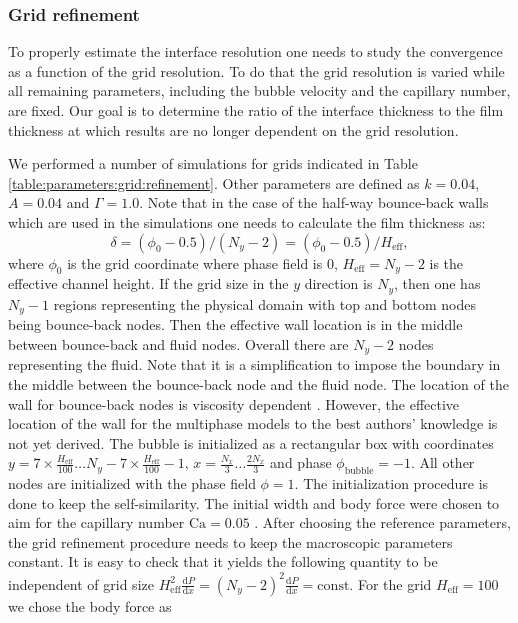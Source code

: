 \documentclass{CFD2011}
\newcommand{\Ca}{\mathrm{Ca}}
\begin{document}
\subsubsection{Grid refinement}
To properly estimate the interface resolution one needs to study the convergence as a function of
the grid resolution. To do that the grid resolution is varied while all remaining parameters,
including the bubble velocity and the capillary number, are fixed.  Our goal is to determine the 
ratio of the interface thickness to the 
film thickness at which results are no longer dependent on the grid resolution.


We performed a number of simulations for grids indicated in
Table \ref{table:parameters:grid:refinement}. Other parameters are defined as $k=0.04$, $A=0.04$ and
$\Gamma=1.0$. Note that in the case of the half-way bounce-back walls \cite{yu} which are used in
the
simulations one needs to calculate the film thickness as:
\begin{equation}
\delta=(\phi_0-0.5)/(N_y-2)=(\phi_0-0.5)/H_{\mathrm{eff}},
\end{equation}
where $\phi_0$ is the grid coordinate where phase field is $0$, $H_{\mathrm{eff}}=N_y-2$
is the effective channel height.
If the grid size in the $y$ direction is $N_y$, then one has $N_y-1$ regions representing
the physical domain with top and bottom nodes being bounce-back nodes. Then the effective wall
location is
in the middle between bounce-back and fluid
nodes. Overall there are $N_y-2$ nodes representing the fluid. Note that it is a simplification to
impose the boundary in the middle between the bounce-back
node and the fluid node. The location of the wall for bounce-back nodes is
viscosity dependent \cite{ginzburg-multireflection}.  However, the effective location of the
wall for the
multiphase models to the best authors' knowledge is not yet derived.
The bubble is initialized as a rectangular box with coordinates
$y=7\times\frac{H_\mathrm{eff}}{100}\dots N_y-7\times\frac{H_\mathrm{eff}}{100}-1$,
$x=\frac{N_x}{3}\dots \frac{2 N_x}{3}$ and phase
$\phi_{\mathrm{bubble}}=-1$. All other nodes are initialized with the phase field
$\phi=1$. The initialization procedure is done to keep the self-similarity. The initial width and
body force were chosen to aim for the capillary number $\Ca=0.05$ \cite{kuzmin-binary2d}.
After choosing the reference parameters, the grid refinement procedure
needs to keep the macroscopic parameters constant.  It is easy to check
that it yields the following quantity to
be independent of grid size
$H_{\mathrm{eff}}^2\frac{\mathrm{d}P}{\mathrm{d}x}=(N_y-2)^2\frac{\mathrm{d}P}{\mathrm{d}
x } = \mathrm{const}$. For the grid $H_{\mathrm{eff}}=100$ we chose the body force as
\end{document}
